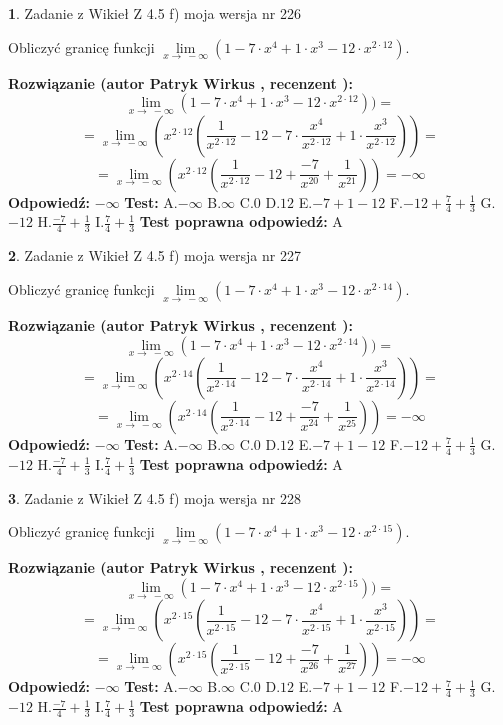 \documentclass[12pt, a4paper]{article}
\theoremstyle{definition} %
\newtheorem{zad}{}
\newcommand{\zadStart}[1]{\begin{zad}#1\newline}
\newcommand{\zadStop}{\end{zad}}
\newcommand{\rozwStart}[2]{\noindent \textbf{Rozwiązanie (autor #1 , recenzent #2): }\newline}
\newcommand{\rozwStop}{\newline}
\newcommand{\odpStart}{\noindent \textbf{Odpowiedź:}\newline}
\newcommand{\odpStop}{\newline}
\newcommand{\testStart}{\noindent \textbf{Test:}\newline}
\newcommand{\testStop}{\newline}
\newcommand{\kluczStart}{\noindent \textbf{Test poprawna odpowiedź:}\newline}
\newcommand{\kluczStop}{\newline}
\begin{document}
\zadStart{Zadanie z Wikieł Z 4.5 f) moja wersja nr 226}



Obliczyć granicę funkcji  $\lim\limits_{x\to\ -\infty}(1 - 7 \cdot x^{4}+1 \cdot x^{3}- 12 \cdot x^{2\cdot12})$.
\zadStop
\rozwStart{Patryk Wirkus}{}
$$\lim\limits_{x\to\ -\infty}(1 - 7 \cdot x^{4}+1 \cdot x^{3}- 12 \cdot x^{2\cdot12}))=$$
$$=\lim\limits_{x\to\ -\infty}(x^{2\cdot12}(\frac{1}{x^{2\cdot12}}-12 -7 \cdot \frac{x^{4}}{x^{2\cdot12}}+1 \cdot \frac{x^{3}}{x^{2\cdot12}}))=$$
$$=\lim\limits_{x\to\ -\infty}(x^{2\cdot12}(\frac{1}{x^{2\cdot12}}-12 + \frac{-7}{x^{20}}+ \frac{1}{x^{21}}))=-\infty$$
\rozwStop
\odpStart
$-\infty$
\odpStop
\testStart
A.$-\infty$ B.$\infty$ C.$0$ D.$12$ E.$-7 + 1 - 12$
F.$-12+\frac{7}{4}+\frac{1}{3}$ G.$-12$
H.$\frac{-7}{4}+\frac{1}{3}$
I.$\frac{7}{4}+\frac{1}{3}$
\testStop
\kluczStart
A
\kluczStop



\zadStart{Zadanie z Wikieł Z 4.5 f) moja wersja nr 227}



Obliczyć granicę funkcji  $\lim\limits_{x\to\ -\infty}(1 - 7 \cdot x^{4}+1 \cdot x^{3}- 12 \cdot x^{2\cdot14})$.
\zadStop
\rozwStart{Patryk Wirkus}{}
$$\lim\limits_{x\to\ -\infty}(1 - 7 \cdot x^{4}+1 \cdot x^{3}- 12 \cdot x^{2\cdot14}))=$$
$$=\lim\limits_{x\to\ -\infty}(x^{2\cdot14}(\frac{1}{x^{2\cdot14}}-12 -7 \cdot \frac{x^{4}}{x^{2\cdot14}}+1 \cdot \frac{x^{3}}{x^{2\cdot14}}))=$$
$$=\lim\limits_{x\to\ -\infty}(x^{2\cdot14}(\frac{1}{x^{2\cdot14}}-12 + \frac{-7}{x^{24}}+ \frac{1}{x^{25}}))=-\infty$$
\rozwStop
\odpStart
$-\infty$
\odpStop
\testStart
A.$-\infty$ B.$\infty$ C.$0$ D.$12$ E.$-7 + 1 - 12$
F.$-12+\frac{7}{4}+\frac{1}{3}$ G.$-12$
H.$\frac{-7}{4}+\frac{1}{3}$
I.$\frac{7}{4}+\frac{1}{3}$
\testStop
\kluczStart
A
\kluczStop



\zadStart{Zadanie z Wikieł Z 4.5 f) moja wersja nr 228}



Obliczyć granicę funkcji  $\lim\limits_{x\to\ -\infty}(1 - 7 \cdot x^{4}+1 \cdot x^{3}- 12 \cdot x^{2\cdot15})$.
\zadStop
\rozwStart{Patryk Wirkus}{}
$$\lim\limits_{x\to\ -\infty}(1 - 7 \cdot x^{4}+1 \cdot x^{3}- 12 \cdot x^{2\cdot15}))=$$
$$=\lim\limits_{x\to\ -\infty}(x^{2\cdot15}(\frac{1}{x^{2\cdot15}}-12 -7 \cdot \frac{x^{4}}{x^{2\cdot15}}+1 \cdot \frac{x^{3}}{x^{2\cdot15}}))=$$
$$=\lim\limits_{x\to\ -\infty}(x^{2\cdot15}(\frac{1}{x^{2\cdot15}}-12 + \frac{-7}{x^{26}}+ \frac{1}{x^{27}}))=-\infty$$
\rozwStop
\odpStart
$-\infty$
\odpStop
\testStart
A.$-\infty$ B.$\infty$ C.$0$ D.$12$ E.$-7 + 1 - 12$
F.$-12+\frac{7}{4}+\frac{1}{3}$ G.$-12$
H.$\frac{-7}{4}+\frac{1}{3}$
I.$\frac{7}{4}+\frac{1}{3}$
\testStop
\kluczStart
A
\kluczStop
\end{document}
